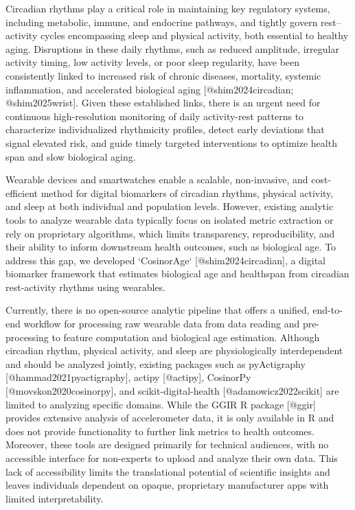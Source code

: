 Circadian rhythms play a critical role in maintaining key regulatory systems, including metabolic, immune, and endocrine pathways, and tightly govern rest–activity cycles encompassing sleep and physical activity, both essential to healthy aging. Disruptions in these daily rhythms, such as reduced amplitude, irregular activity timing, low activity levels, or poor sleep regularity, have been consistently linked to increased risk of chronic diseases, mortality, systemic inflammation, and accelerated biological aging [@shim2024circadian; @shim2025wrist]. Given these established links, there is an urgent need for continuous high-resolution monitoring of daily activity-rest patterns to characterize individualized rhythmicity profiles, detect early deviations that signal elevated risk, and guide timely targeted interventions to optimize health span and slow biological aging.  

Wearable devices and smartwatches enable a scalable, non-invasive, and cost-efficient method for digital biomarkers of circadian rhythms, physical activity, and sleep at both individual and population levels. However, existing analytic tools to analyze wearable data typically focus on isolated metric extraction or rely on proprietary algorithms, which limits transparency, reproducibility, and their ability to inform downstream health outcomes, such as biological age. To address this gap, we developed `CosinorAge` [@shim2024circadian], a digital biomarker framework that estimates biological age and healthspan from circadian rest-activity rhythms using wearables.  

Currently, there is no open-source analytic pipeline that offers a unified, end-to-end workflow for processing raw wearable data from data reading and pre-processing to feature computation and biological age estimation. Although circadian rhythm, physical activity, and sleep are physiologically interdependent and should be analyzed jointly, existing packages such as pyActigraphy [@hammad2021pyactigraphy], actipy [@actipy], CosinorPy [@movskon2020cosinorpy], and scikit-digital-health [@adamowicz2022scikit] are limited to analyzing specific domains. While the GGIR R package [@ggir] provides extensive analysis of accelerometer data, it is only available in R and does not provide functionality to further link metrics to health outcomes. Moreover, these tools are designed primarily for technical audiences, with no accessible interface for non-experts to upload and analyze their own data. This lack of accessibility limits the translational potential of scientific insights and leaves individuals dependent on opaque, proprietary manufacturer apps with limited interpretability.  

